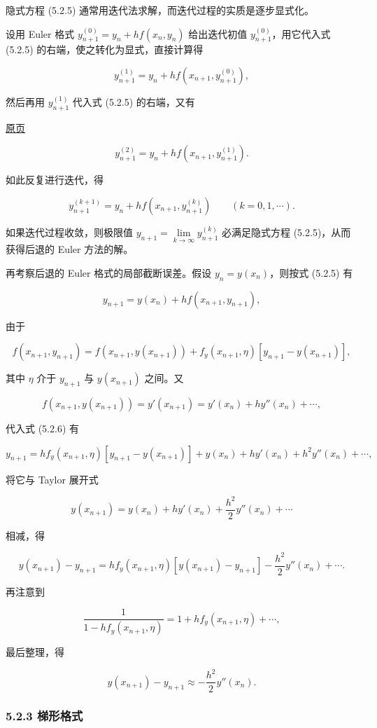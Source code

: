 \documentclass[
  10pt,
  fontset=fandol]{ctexart}
\begin{document}
隐式方程 (5.2.5) 通常用迭代法求解，而迭代过程的实质是逐步显式化。

设用 Euler 格式 \(y_{n+1}^{(0)}=y_n+hf(x_n,y_n)\) 给出迭代初值 \(y_{n+1}^{(0)}\)，用它代入式 (5.2.5) 的右端，使之转化为显式，直接计算得

\[
y_{n+1}^{(1)}=y_n+hf(x_{n+1},y_{n+1}^{(0)}),
\]

然后再用 \(y_{n+1}^{(1)}\) 代入式 (5.2.5) 的右端，又有

\href{../../source-images/pdf-122.jpeg}{原页}

\[
y_{n+1}^{(2)}=y_n+hf(x_{n+1},y_{n+1}^{(1)}).
\]

如此反复进行迭代，得

\[
y_{n+1}^{(k+1)}=y_n+hf(x_{n+1},y_{n+1}^{(k)})\qquad(k=0,1,\cdots).
\]

如果迭代过程收敛，则极限值 \(y_{n+1}=\lim\limits_{k\to\infty}y_{n+1}^{(k)}\) 必满足隐式方程 (5.2.5)，从而获得后退的 Euler 方法的解。

再考察后退的 Euler 格式的局部截断误差。假设 \(y_n=y(x_n)\)，则按式 (5.2.5) 有

\[
y_{n+1}=y(x_n)+hf(x_{n+1},y_{n+1}),\tag{5.2.6}
\]

由于

\[
f(x_{n+1},y_{n+1})=f(x_{n+1},y(x_{n+1}))+f_y(x_{n+1},\eta)[y_{n+1}-y(x_{n+1})],
\]

其中 \(\eta\) 介于 \(y_{n+1}\) 与 \(y(x_{n+1})\) 之间。又

\[
f(x_{n+1},y(x_{n+1}))=y'(x_{n+1})=y'(x_n)+hy''(x_n)+\cdots,
\]

代入式 (5.2.6) 有

\[
y_{n+1}=hf_y(x_{n+1},\eta)[y_{n+1}-y(x_{n+1})]+y(x_n)+hy'(x_n)+h^2y''(x_n)+\cdots,
\]

将它与 Taylor 展开式

\[
y(x_{n+1})=y(x_n)+hy'(x_n)+\frac{h^2}{2}y''(x_n)+\cdots
\]

相减，得

\[
y(x_{n+1})-y_{n+1}=hf_y(x_{n+1},\eta)[y(x_{n+1})-y_{n+1}]-\frac{h^2}{2}y''(x_n)+\cdots.
\]

再注意到

\[
\frac{1}{1-hf_y(x_{n+1},\eta)}=1+hf_y(x_{n+1},\eta)+\cdots,
\]

最后整理，得

\[
y(x_{n+1})-y_{n+1}\approx-\frac{h^2}{2}y''(x_n).\tag{5.2.7}
\]

\subsubsection{5.2.3 梯形格式}\label{ux68afux5f62ux683cux5f0f}
\end{document}
